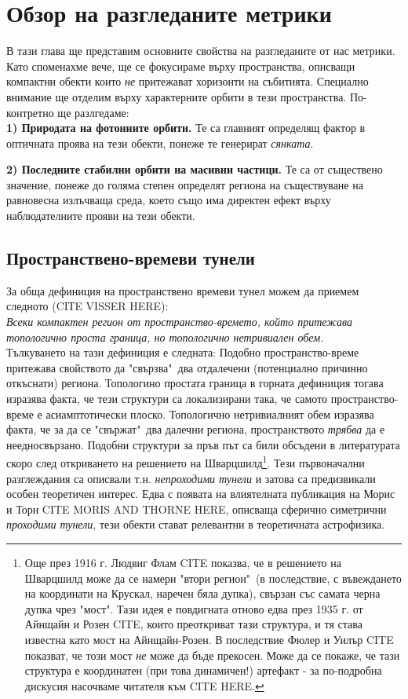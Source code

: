 \section{Обзор на разгледаните метрики}
В тази глава ще представим основните свойства на разгледаните от нас метрики. Като споменахме вече, ще се фокусираме върху пространства, описващи компактни обекти които \emph{не} притежават хоризонти на събитията. Специално внимание ще отделим върху характерните орбити в тези пространства. По-контретно ще разлгедаме:\\

\noindent\textbf{1) Природата на фотонните орбити.} Те са главният определящ фактор в оптичната проява на тези обекти, понеже те генерират \emph{сянката}.\newline

\noindent\textbf{2) Последните стабилни орбити на масивни частици.} Те са от съществено значение, понеже до голяма степен определят региона на съществуване на равновесна излъчваща среда, което също има директен ефект върху наблюдателните прояви на тези обекти.
 
\subsection{Пространствено-времеви тунели}
За обща дефиниция на пространствено времеви тунел можем да приемем следното (CIТE VISSER HERE):\\

\emph{Всеки компактен регион от пространство-времето, който притежава топологично проста граница, но топологично нетривиален обем.}\\\newline
Тълкуването на тази дефиниция е следната: Подобно пространство-време притежава свойството да "свързва"$\,$ два отдалечени (потенциално причинно откъснати) региона. Топологино простата граница в горната дефиниция тогава изразява факта, че тези структури са локализирани така, че самото пространство-време е асиамптотически плоско. Топологично нетривиалният обем изразява факта, че за да се "свържат"$\,$ два далечни региона, пространството \emph{трябва} да е неедносвързано. Подобни структури за пръв път са били обсъдени в литературата скоро след откриването на решението на Шварцшилд\footnote{ Още през 1916 г. Людвиг Флам CITE показва, че в решението на Шварцшилд може да се намери "втори регион"$\,$ (в последствие, с въвеждането на координати на Крускал, наречен бяла дупка), свързан със самата черна дупка чрез "мост". Тази идея е повдигната отново едва през 1935 г. от Айнщайн и Розен CITE, които преоткриват тази структура, и тя става известна като мост на Айнщайн-Розен. В последствие Фюлер и Уилър CITE показват, че този мост \emph{не} може да бъде прекосен. Може да се покаже, че тази структура е координатен (при това динамичен!) артефакт - за по-подробна дискусия насочваме читателя към CITE HERE.}. Тези първоначални разглеждания са описвали т.н. \emph{непроходими тунели} и затова са предизвикали особен теоретичен интерес. Едва с появата на влиятелната публикация на Морис и Торн CITE MORIS AND THORNE HERE, описваща сферично симетрични \emph{проходими тунели}, тези обекти стават релевантни в теоретичната астрофизика.\newpage

